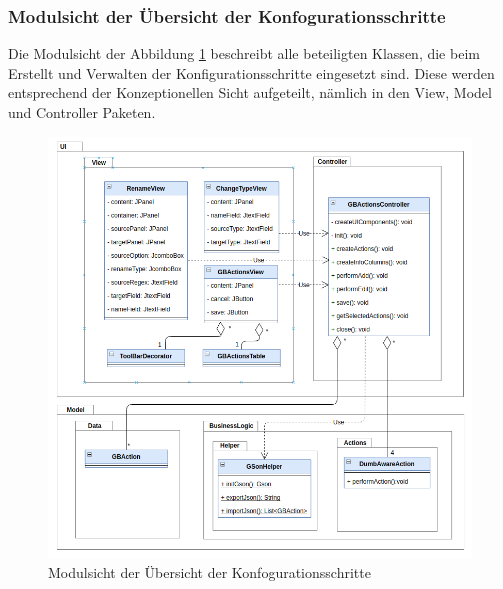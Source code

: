 \subsubsection{Modulsicht der Übersicht der Konfogurationsschritte}
Die Modulsicht der Abbildung \ref{img:modulsicht-gbactions} beschreibt alle beteiligten Klassen, die beim Erstellt und Verwalten der Konfigurationsschritte eingesetzt sind. Diese werden entsprechend der Konzeptionellen Sicht aufgeteilt, nämlich in den View, Model und Controller Paketen.\\
\begin{figure}[H]
\centering
\includegraphics[width=\textwidth]{images/sichten/modulsicht-gbactions}
\caption{Modulsicht der Übersicht der Konfogurationsschritte}
\label{img:modulsicht-gbactions}
\end{figure}
